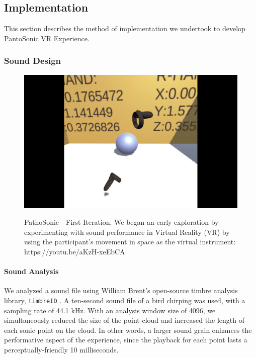 \documentclass{nime-alternate}
\begin{document}

\subsection{Implementation}

This section describes the method of implementation we undertook to develop PantoSonic VR Experience.

\subsubsection{Sound Design}


\begin{figure}[htbp]
       \centering
              \includegraphics[width=1\textwidth]{first_iteration.png}
       \label{PathoSonic - First Iteration. We began an early exploration by experimenting with sound performance in Virtual Reality (VR) by using the participant's movement in space as the virtual instrument: https://youtu.be/aKzH-xeEbCA}
       \caption{PathoSonic - First Iteration. We began an early exploration by experimenting with sound performance in Virtual Reality (VR) by using the participant's movement in space as the virtual instrument: https://youtu.be/aKzH-xeEbCA}
\end{figure}

\paragraph{Sound Analysis} We analyzed a sound file using William Brent's open-source timbre analysis library, \texttt{timbreID} \cite{icmc/bbp2372.2010.044}. A ten-second sound file of a bird chirping was used, with a sampling rate of 44.1 kHz. With an analysis window size of 4096, we simultaneously reduced the size of the point-cloud and increased the length of each sonic point on the cloud. In other words, a larger sound grain enhances the performative aspect of the experience, since the playback for each point lasts a perceptually-friendly 10 milliseconds.
\end{document}
